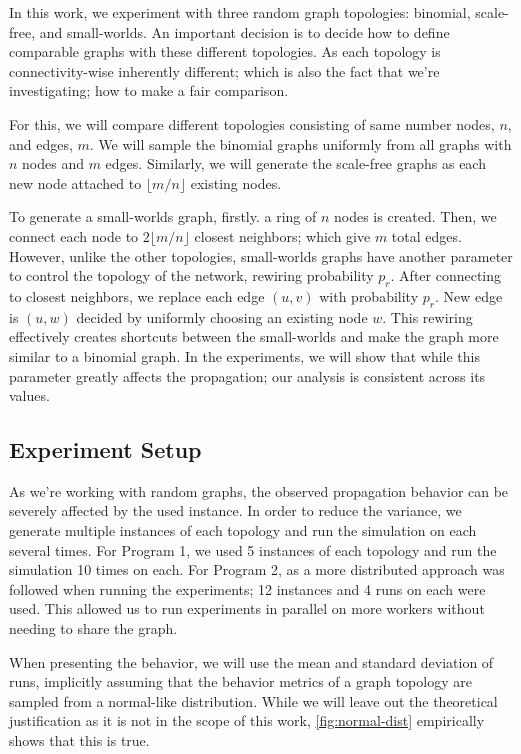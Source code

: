 \documentclass[conference]{IEEEtran}
\begin{document}
In this work, we experiment with three random graph topologies: binomial, scale-free, and small-worlds. An important decision is
to decide how to define comparable graphs with these different topologies. As each topology is connectivity-wise inherently different; which is also the fact that we're investigating; how to make a fair comparison.

For this, we will compare different topologies consisting of same number nodes, $n$, and edges, $m$. We will sample the binomial graphs uniformly from all graphs with $n$ nodes and $m$ edges. Similarly, we will generate the scale-free graphs as each new node attached to $\lfloor m/n\rfloor$ existing nodes.

To generate a small-worlds graph, firstly. a ring of $n$ nodes is created. Then, we connect each node to $2\lfloor m/n\rfloor$ closest neighbors; which give $m$ total edges. However, unlike the other topologies, small-worlds graphs have another parameter to control the topology of the network, rewiring probability $p_r$. After connecting to closest neighbors, we replace each edge $(u,v)$ with probability $p_r$. New edge is $(u,w)$ decided by uniformly choosing an existing node $w$. This rewiring effectively creates shortcuts between the small-worlds and make the graph more similar to a binomial graph. In the experiments, we will show that while this parameter greatly affects the propagation; our analysis is consistent across its values.


\subsection{Experiment Setup}

As we're working with random graphs, the observed propagation behavior can be severely affected by the used instance. In order to reduce the variance, we generate multiple instances of each topology and run the simulation on each several times. For Program 1, we used 5 instances of each topology and run the simulation 10 times on each. For Program 2, as a more distributed approach was followed when running the experiments; 12 instances and 4 runs on each were used. This allowed us to run experiments in parallel on more workers without needing to share the graph.

When presenting the behavior, we will use the mean and standard deviation of runs, implicitly assuming that the behavior metrics of a graph topology are sampled from a normal-like distribution. While we will leave out the theoretical justification as it is not in the scope of this work, \autoref{fig:normal-dist} empirically shows that this is true.
\end{document}
